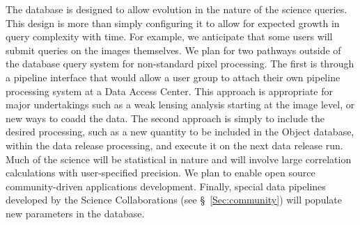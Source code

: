 \documentclass{emulateapj}
\begin{document}
The database is designed to allow evolution in the nature of the science queries. 
This design is more than simply configuring it
to allow for expected growth in query complexity with time. For
example, we anticipate that some users will submit queries on the images 
themselves. We plan for two pathways outside of the database query system
for non-standard pixel processing. The first is through a pipeline interface
that would allow a user group to attach their own pipeline processing system
at a Data Access Center. This approach is appropriate for major undertakings 
such as a weak lensing analysis starting at the image level,
or new ways to coadd the data. The second approach is simply to include the 
desired processing, such as a new quantity to be included in the Object database, 
within the data release processing, and execute it on the next data release 
run. Much of the science will be statistical in nature and will involve large 
correlation calculations with user-specified precision. We plan to enable
open source community-driven applications development. Finally, special data 
pipelines developed by the Science Collaborations (see \S~\ref{Sec:community}) 
will populate new parameters in the database. 
\end{document}
